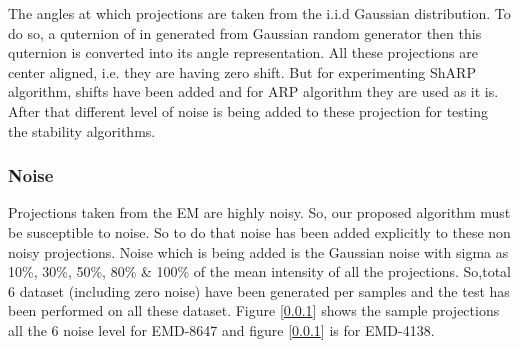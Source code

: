 \documentclass{report}
\begin{document}
The angles at which projections are taken from the i.i.d Gaussian distribution. To do so, a quternion of in generated from Gaussian random generator then this quternion is converted into its angle representation.  All these projections are center aligned, i.e. they are having zero shift. But for experimenting ShARP algorithm, shifts have been added and for ARP algorithm they are used as it is.  After that different level of noise is being added to these projection for testing the stability algorithms.

\subsubsection{Noise}

Projections taken from the EM are highly noisy. So, our proposed algorithm must be susceptible to noise. So to do that noise has been added explicitly to these non noisy projections. Noise which is being added is the Gaussian noise with sigma as 10\%, 30\%, 50\%, 80\% \& 100\%  of the mean intensity of all the projections. So,total 6 dataset (including zero noise) have been generated per samples and the test has been performed on all these dataset. Figure [\ref{}] shows the sample projections all the 6 noise level for EMD-8647 and figure [\ref{}] is for EMD-4138.
\end{document}
